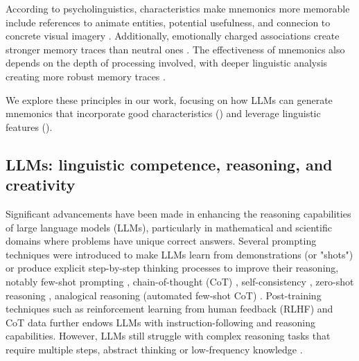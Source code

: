 According to psycholinguistics, characteristics make mnemonics more memorable include references to animate entities, potential usefulness, and connecion to concrete visual imagery \citep{madanExploringWordMemorability2021, ledingAdaptiveMemoryAnimacy2019}. Additionally, emotionally charged associations create stronger memory traces than neutral ones \citep{altarribaConcretenessContextAvailability1999}. The effectiveness of mnemonics also depends on the depth of processing involved, with deeper linguistic analysis creating more robust memory traces \citep{rankinAgePresentationRate1983, SariogluUSE2024}.

We explore these principles in our work, focusing on how LLMs can generate mnemonics that incorporate good characteristics () and leverage linguistic features ().

\subsection{LLMs: linguistic competence, reasoning, and creativity} \label{sec:llm-linguistic-competence}

Significant advancements have been made in enhancing the reasoning capabilities of large language models (LLMs), particularly in mathematical and scientific domains where problems have unique correct answers. Several prompting techniques were introduced to make LLMs learn from demonstrations (or "shots") or produce explicit step-by-step thinking processes to improve their reasoning, notably few-shot prompting \citep{brownFewShotLearners2020}, chain-of-thought (CoT) \citep{weiChainofThoughtPromptingElicits2022}, self-consistency \citep{wangSelfConsistencyImprovesChain2022}, zero-shot reasoning \citep{kojimaZeroShotReasoners2022}, analogical reasoning (automated few-shot CoT) \citep{YasunagaLLMAnalogicalReasoners2023}. Post-training techniques such as reinforcement learning from human feedback (RLHF) \citep{ouyangRLHF2022} and CoT data \citep{DeepSeek-AIDEEPSEEKR12025} further endows LLMs with instruction-following and reasoning capabilities. However, LLMs still struggle with complex reasoning tasks that require multiple steps, abstract thinking \citep{weiChainofThoughtPromptingElicits2022} or low-frequency knowledge \citep{kandpalLongTailKnowledge2023,sunHeadtoTailHowKnowledgeable2024}.

